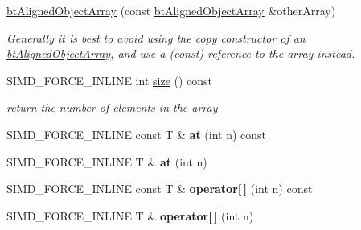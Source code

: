 \begin{DoxyCompactItemize}
\item 
\mbox{\label{classbtAlignedObjectArray_ae91d1383db8069a02d23caf915bc2ce3}} 
\hyperlink{classbtAlignedObjectArray_ae91d1383db8069a02d23caf915bc2ce3}{bt\+Aligned\+Object\+Array} (const \hyperlink{classbtAlignedObjectArray}{bt\+Aligned\+Object\+Array} \&other\+Array)
\begin{DoxyCompactList}\small\item\em Generally it is best to avoid using the copy constructor of an \hyperlink{classbtAlignedObjectArray}{bt\+Aligned\+Object\+Array}, and use a (const) reference to the array instead. \end{DoxyCompactList}\item 
\mbox{\label{classbtAlignedObjectArray_a31de8d83d29c6edd1493fc583091194c}} 
S\+I\+M\+D\+\_\+\+F\+O\+R\+C\+E\+\_\+\+I\+N\+L\+I\+NE int \hyperlink{classbtAlignedObjectArray_a31de8d83d29c6edd1493fc583091194c}{size} () const
\begin{DoxyCompactList}\small\item\em return the number of elements in the array \end{DoxyCompactList}\item 
\mbox{\label{classbtAlignedObjectArray_a26ccc5e9cd7412de584785d219bafff6}} 
S\+I\+M\+D\+\_\+\+F\+O\+R\+C\+E\+\_\+\+I\+N\+L\+I\+NE const T \& {\bfseries at} (int n) const
\item 
\mbox{\label{classbtAlignedObjectArray_a3792644f8e758fae5b4613fbcd1fd30f}} 
S\+I\+M\+D\+\_\+\+F\+O\+R\+C\+E\+\_\+\+I\+N\+L\+I\+NE T \& {\bfseries at} (int n)
\item 
\mbox{\label{classbtAlignedObjectArray_a20eda69c4274d87170a6bd2d9ea97054}} 
S\+I\+M\+D\+\_\+\+F\+O\+R\+C\+E\+\_\+\+I\+N\+L\+I\+NE const T \& {\bfseries operator\mbox{[}$\,$\mbox{]}} (int n) const
\item 
\mbox{\label{classbtAlignedObjectArray_a29680dc26edbd4691d7b6a43d5a60840}} 
S\+I\+M\+D\+\_\+\+F\+O\+R\+C\+E\+\_\+\+I\+N\+L\+I\+NE T \& {\bfseries operator\mbox{[}$\,$\mbox{]}} (int n)
\item 
\mbox{\label{classbtAlignedObjectArray_a12123db01dda7758f0df5e3bba10cc0a}} 

\end{DoxyCompactItemize}
